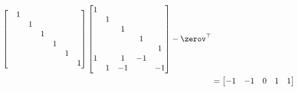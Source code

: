 \documentclass{ctexart}
\begin{document}
\begin{example} 
\begin{align*}
\begin{bmatrix}
                                               & 1 &   &   &   &   &   \\
                                               &   & 1 &   &   &   &   \\
                                               &   &   & 1 &   &   &   \\
                                               &   &   &   & 1 &   &   \\
                                               &   &   &   &   & 1 &   \\
                                               &   &   &   &   &   & 1 \\
                                         \end{bmatrix} \begin{bmatrix}
                                                           1 &   &    &    &    \\
                                                             & 1 &    &    &    \\
                                                             &   & 1  &    &    \\
                                                             &   &    & 1  &    \\
                                                             &   &    &    & 1  \\
                                                           1 &   & 1  & -1 &    \\
                                                             & 1 & -1 &    & -1 \\
                                                       \end{bmatrix} - \zerov^\top \\
                       & = \begin{bmatrix}
                               -1 & -1 & 0 & 1 & 1
                           \end{bmatrix}
    \end{align*}


\end{example}
\end{document}
